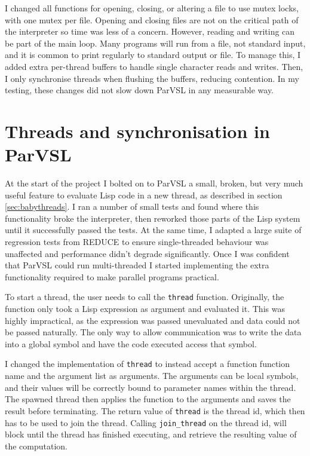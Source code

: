 I changed all functions for opening, closing, or altering a file to use mutex locks, with one mutex per file.
Opening and closing files are not on the critical path of the interpreter so time was less of a concern.
However, reading and writing can be part of the main loop. Many programs will run from a file, not standard input,
and it is common to print regularly to standard output or file. To manage this, I added extra per-thread buffers
to handle single character reads and writes. Then, I only synchronise threads when flushing the buffers, reducing
contention. In my testing, these changes did not slow down ParVSL in any measurable way.

\section{Threads and synchronisation in ParVSL}
\label{sec:threads}

At the start of the project I bolted on to ParVSL a small, broken, but very much useful feature to evaluate
Lisp code in a new thread, as described in section \ref{sec:babythreads}. I ran a number of small tests
and found where this functionality broke the interpreter, then reworked those parts of the Lisp system
until it successfully passed the tests. At the same time, I adapted a large suite of regression tests
from REDUCE to ensure single-threaded behaviour was unaffected and performance didn't degrade significantly.
Once I was confident that ParVSL could run multi-threaded I started implementing the extra functionality
required to make parallel programs practical.

To start a thread, the user needs to call the \verb|thread| function.
Originally, the function only took a Lisp expression as argument and evaluated it. This was highly impractical,
as the expression was passed unevaluated and data could not be passed naturally. The only way to allow
communication was to write the data into a global symbol and have the code executed access that symbol.

I changed the implementation of \verb|thread| to instead accept a function function name and the argument list
as arguments. The arguments can be local symbols, and their values will be correctly bound to parameter names
within the thread. The spawned thread then applies the function to the arguments and saves the result
before terminating. The return value of \verb|thread| is the thread id, which then has to be used to
join the thread. Calling  \verb|join_thread| on the thread id, will block until the thread has finished
executing, and retrieve the resulting value of the computation.

